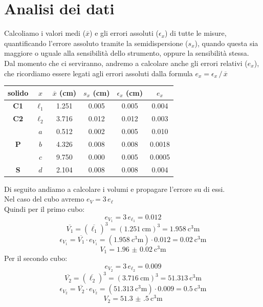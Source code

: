 \documentclass[12pt]{scrartcl}
\begin{document}
\section{Analisi dei dati}

Calcoliamo i valori medi (\(\overline{x}\)) e gli errori assoluti (\(\epsilon_x\))
di tutte le misure, quantificando l'errore assoluto tramite la semidispersione
(\(s_x\)), quando questa sia maggiore o uguale alla sensibilità dello strumento,
oppure la sensibilità stessa. Dal momento che ci serviranno, andremo a calcolare anche gli errori
relativi (\(e_x\)), che ricordiamo essere legati agli errori assoluti dalla formula
\(e_x = {\epsilon_x} \, / \, {\overline{x}}\)

\begin{center}\begin{tabular}{cccccc}
  \toprule
  \textbf{solido} & \(x\) & \(\overline{x}\) (\si{\centi\metre}) & \(s_x\) (\si{\centi\metre}) & \(\epsilon_x\) (\si{\centi\metre}) & \(e_x\)\\
  \midrule
  \textbf{C1} & \(\ell_1\) & \num{1.251} & \num{0.005} & \num{0.005} & \num{0.004}\\
  \midrule
  \textbf{C2} & \(\ell_2\) & \num{3.716} & \num{0.012} & \num{0.012} & \num{0.003} \\
  \midrule
  \multirow{3}{*}{\textbf{P}} & \(a\) & \num{0.512} & \num{0.002} & \num{0.005} & \num{0.010}\\
                              & \(b\) & \num{4.326} & \num{0.008} & \num{0.008} & \num{0.0018} \\
                              & \(c\) & \num{9.750} & \num{0.000} & \num{0.005} & \num{0.0005} \\
  \midrule
  \textbf{S} & \(d\) & \num{2.104} & \num{0.008} & \num{0.008} & \num{0.004} \\
  \bottomrule
\end{tabular}\end{center}

Di seguito andiamo a calcolare i volumi e propagare l'errore su di essi.\\[1em]
%
Nel caso del cubo avremo \(e_V = 3 \, e_\ell\)\\[1em]
%
Quindi per il primo cubo:
\[e_{V_1} = 3 \, e_{\ell_1} = \num{0.012}\]
\[\overline{V_1} = \left( \overline{\ell_1} \right)^3 = \left( \SI{1.251}{\centi\metre} \right)^3 = \SI{1.958}{\cubic\centi\metre}\]
\[\epsilon_{V_1} = \overline{V_1} \cdot e_{V_1} = \left(\SI{1.958}{\cubic\centi\metre}\right) \cdot \num{0.012} = \SI{0.02}{\cubic\centi\metre} \]
\[V_1 = \SI{1.96(2)}{\cubic\centi\metre}\]
%
Per il secondo cubo:
\[e_{V_2} = 3 \, e_{\ell_2} = \num{0.009}\]
\[\overline{V_2} = \left( \overline{\ell_2} \right)^3 = \left( \SI{3.716}{\centi\metre} \right)^3 = \SI{51.313}{\cubic\centi\metre}\]
\[\epsilon_{V_2} = \overline{V_2} \cdot e_{V_2} = \left(\SI{51.313}{\cubic\centi\metre}\right) \cdot \num{0.009} = \SI{0.5}{\cubic\centi\metre} \]
\[V_2 = \SI{51.3(5)}{\cubic\centi\metre}\]
\end{document}
